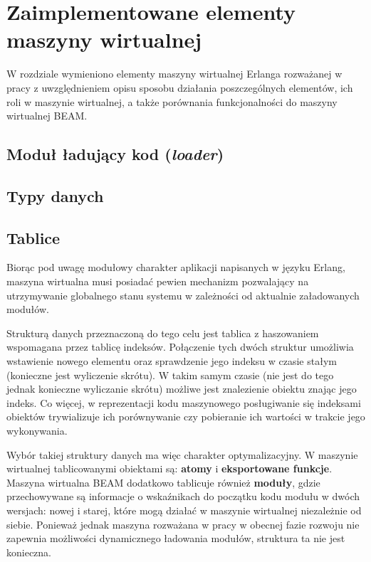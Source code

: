 \chapter{Zaimplementowane elementy maszyny wirtualnej}
\label{cha:maszyna}

W rozdziale wymieniono elementy maszyny wirtualnej Erlanga rozważanej w pracy z uwzględnieniem 
opisu sposobu działania poszczególnych elementów, ich roli w maszynie wirtualnej, a także porównania
funkcjonalności do maszyny wirtualnej BEAM.

\section{Moduł ładujący kod (\emph{loader})}
\label{sec:maszynaLoader}

\section{Typy danych}
\label{sec:maszynaTypy}

\section{Tablice}
\label{sec:maszynaTablice}

Biorąc pod uwagę modułowy charakter aplikacji napisanych w języku Erlang, maszyna wirtualna musi posiadać pewien mechanizm pozwalający na utrzymywanie globalnego stanu systemu w zależności od aktualnie załadowanych modułów.

Strukturą danych przeznaczoną do tego celu jest tablica z haszowaniem wspomagana przez tablicę indeksów. Połączenie tych dwóch struktur umożliwia wstawienie nowego elementu oraz sprawdzenie jego indeksu w czasie stałym (konieczne jest wyliczenie skrótu). W takim samym czasie (nie jest do tego jednak konieczne wyliczanie skrótu) możliwe jest znalezienie obiektu znając jego indeks. Co więcej, w reprezentacji kodu maszynowego posługiwanie się indeksami obiektów trywializuje ich porównywanie czy pobieranie ich wartości w trakcie jego wykonywania.

Wybór takiej struktury danych ma więc charakter optymalizacyjny. W maszynie wirtualnej tablicowanymi obiektami są: \textbf{atomy} i \textbf{eksportowane funkcje}. Maszyna wirtualna BEAM dodatkowo tablicuje również \textbf{moduły}, gdzie przechowywane są informacje o wskaźnikach do początku kodu modułu w dwóch wersjach: nowej i starej, które mogą działać w maszynie wirtualnej niezależnie od siebie. Ponieważ jednak maszyna rozważana w pracy w obecnej fazie rozwoju nie zapewnia możliwości dynamicznego ładowania modułów, struktura ta nie jest konieczna.

